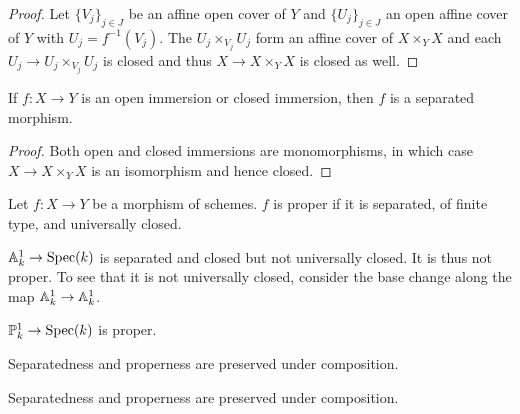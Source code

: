 \begin{proof}
    Let $\{V_{j}\}_{j\in J}$ be an affine open cover of $Y$ and $\{U_{j}\}_{j\in J}$ an open affine cover of $Y$ with $U_{j}=f^{-1}(V_{j})$. The $U_{j}\times_{V_{j}}U_{j}$ form an affine cover of $X\times_{Y}X$ and each $U_{j}\to U_{j}\times_{V_{j}}U_{j}$ is closed and thus $X\to X\times_{Y}X$ is closed as well. 
\end{proof}
\begin{proposition}\label{prop: open and closed immersions are separated}
    If $f:X\to Y$ is an open immersion or closed immersion, then $f$ is a separated morphism. 
\end{proposition}
\begin{proof}
    Both open and closed immersions are monomorphisms, in which case $X\to X\times_{Y}X$ is an isomorphism and hence closed. 
\end{proof}
\begin{definition}\label{def: proper morphism}
    Let $f:X\to Y$ be a morphism of schemes. $f$ is proper if it is separated, of finite type, and universally closed. 
\end{definition}
\begin{example}
    $\mathbb{A}^{1}_{k}\to\operatorname{Spec}(k)$ is separated and closed but not universally closed. It is thus not proper. To see that it is not universally closed, consider the base change along the map $\mathbb{A}^{1}_{k}\to\mathbb{A}^{1}_{k}$. 
\end{example}
\begin{example}
    $\mathbb{P}^{1}_{k}\to\operatorname{Spec}(k)$ is proper. 
\end{example}
Separatedness and properness are preserved under composition. 
\begin{proposition}
    Separatedness and properness are preserved under composition. 
\end{proposition}
